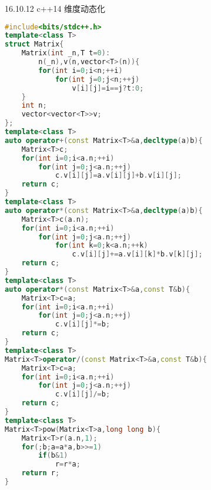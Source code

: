 \documentclass{book}
\begin{document}
16.10.12
c++14
维度动态化
\begin{lstlisting}[language=C++,title={Matrix.hpp (1274 bytes, 53 lines)}]
#include<bits/stdc++.h>
template<class T>
struct Matrix{
    Matrix(int _n,T t=0):
        n(_n),v(n,vector<T>(n)){
        for(int i=0;i<n;++i)
            for(int j=0;j<n;++j)
                v[i][j]=i==j?t:0;
    }
    int n;
    vector<vector<T>>v;    
};
template<class T>
auto operator+(const Matrix<T>&a,decltype(a)b){
    Matrix<T>c;
    for(int i=0;i<a.n;++i)
        for(int j=0;j<a.n;++j)
            c.v[i][j]=a.v[i][j]+b.v[i][j];
    return c;
}
template<class T>
auto operator*(const Matrix<T>&a,decltype(a)b){
    Matrix<T>c(a.n);
    for(int i=0;i<a.n;++i)
        for(int j=0;j<a.n;++j)
            for(int k=0;k<a.n;++k)
                c.v[i][j]+=a.v[i][k]*b.v[k][j];
    return c;
}
template<class T>
auto operator*(const Matrix<T>&a,const T&b){
    Matrix<T>c=a;
    for(int i=0;i<a.n;++i)
        for(int j=0;j<a.n;++j)
            c.v[i][j]*=b;
    return c;
}
template<class T>
Matrix<T>operator/(const Matrix<T>&a,const T&b){
    Matrix<T>c=a;
    for(int i=0;i<a.n;++i)
        for(int j=0;j<a.n;++j)
            c.v[i][j]/=b;
    return c;
}
template<class T>
Matrix<T>pow(Matrix<T>a,long long b){
    Matrix<T>r(a.n,1);
    for(;b;a=a*a,b>>=1)
        if(b&1)
            r=r*a;
    return r;
}\end{lstlisting}
\end{document}

